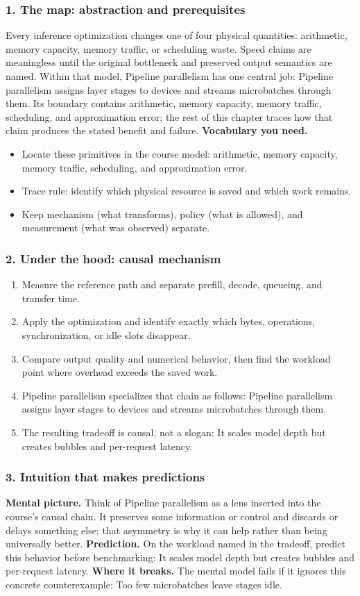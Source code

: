 \subsubsection*{1. The map: abstraction and prerequisites}
Every inference optimization changes one of four physical quantities: arithmetic, memory capacity, memory traffic, or scheduling waste. Speed claims are meaningless until the original bottleneck and preserved output semantics are named.
Within that model, Pipeline parallelism has one central job: Pipeline parallelism assigns layer stages to devices and streams microbatches through them. Its boundary contains arithmetic, memory capacity, memory traffic, scheduling, and approximation error; the rest of this chapter traces how that claim produces the stated benefit and failure.
\textbf{Vocabulary you need.}\begin{itemize}
\item Locate these primitives in the course model: arithmetic, memory capacity, memory traffic, scheduling, and approximation error.
\item Trace rule: identify which physical resource is saved and which work remains.
\item Keep mechanism (what transforms), policy (what is allowed), and measurement (what was observed) separate.
\end{itemize}
\subsubsection*{2. Under the hood: causal mechanism}\begin{enumerate}
\item Measure the reference path and separate prefill, decode, queueing, and transfer time.
\item Apply the optimization and identify exactly which bytes, operations, synchronization, or idle slots disappear.
\item Compare output quality and numerical behavior, then find the workload point where overhead exceeds the saved work.
\item Pipeline parallelism specializes that chain as follows: Pipeline parallelism assigns layer stages to devices and streams microbatches through them.
\item The resulting tradeoff is causal, not a slogan: It scales model depth but creates bubbles and per-request latency.
\end{enumerate}
\subsubsection*{3. Intuition that makes predictions}
\textbf{Mental picture.} Think of Pipeline parallelism as a lens inserted into the course's causal chain. It preserves some information or control and discards or delays something else; that asymmetry is why it can help rather than being universally better.
\textbf{Prediction.} On the workload named in the tradeoff, predict this behavior before benchmarking: It scales model depth but creates bubbles and per-request latency.
\textbf{Where it breaks.} The mental model fails if it ignores this concrete counterexample: Too few microbatches leave stages idle.
